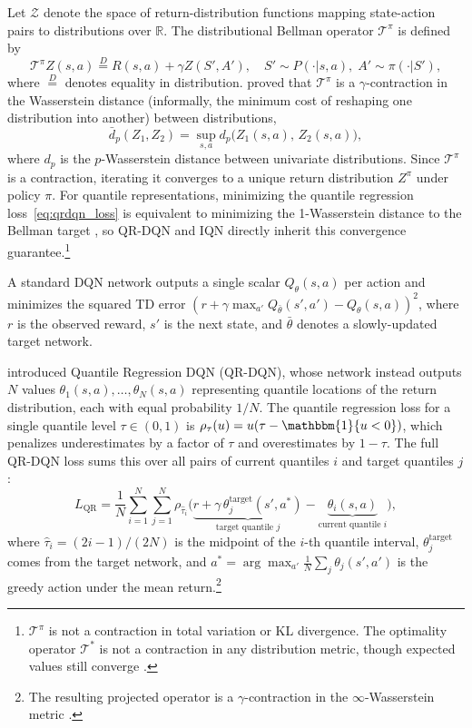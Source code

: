 Let $\mathcal{Z}$ denote the space of return-distribution functions mapping
state-action pairs to distributions over $\mathbb{R}$. The distributional
Bellman operator $\mathcal{T}^\pi$ is defined by
\begin{equation}
  \mathcal{T}^\pi Z(s,a) \stackrel{D}{=} R(s,a) + \gamma Z(S', A'),
  \quad S' \sim P(\cdot|s,a), \; A' \sim \pi(\cdot|S'),
  \label{eq:dist_bellman}
\end{equation}
where $\stackrel{D}{=}$ denotes equality in distribution.
\citet{Bellemare2017} proved that $\mathcal{T}^\pi$ is a $\gamma$-contraction
in the Wasserstein distance (informally, the minimum cost of reshaping one distribution into another) between distributions,
\begin{equation}
  \bar{d}_p(Z_1, Z_2) = \sup_{s,a} d_p\bigl(Z_1(s,a),\, Z_2(s,a)\bigr),
  \label{eq:wasserstein_metric}
\end{equation}
where $d_p$ is the $p$-Wasserstein distance between univariate
distributions. Since $\mathcal{T}^\pi$ is a contraction, iterating it
converges to a unique return distribution $Z^\pi$ under policy
$\pi$. For quantile representations, minimizing the quantile regression
loss~\eqref{eq:qrdqn_loss} is equivalent to minimizing the 1-Wasserstein
distance to the Bellman target \citep{Dabney2018a}, so QR-DQN and IQN
directly inherit this convergence guarantee.\footnote{$\mathcal{T}^\pi$
is not a contraction in total variation or KL divergence. The optimality operator $\mathcal{T}^*$ is not a contraction
in any distribution metric, though expected values still converge
\citep{Bellemare2017}.}

A standard DQN network outputs a single scalar $Q_\theta(s,a)$ per action
and minimizes the squared TD error
$(r + \gamma \max_{a'} Q_{\bar{\theta}}(s',a') - Q_\theta(s,a))^2$,
where $r$ is the observed reward, $s'$ is the next state, and
$\bar{\theta}$ denotes a slowly-updated target network.

\citet{Dabney2018a} introduced Quantile Regression DQN (QR-DQN), whose
network instead outputs $N$ values $\theta_1(s,a), \ldots, \theta_N(s,a)$
representing quantile locations of the return distribution, each with
equal probability $1/N$. The quantile regression loss for a single
quantile level $\tau \in (0,1)$ is
$\rho_\tau(u) = u(\tau - \mathbbm{1}\{u < 0\})$, which penalizes
underestimates by a factor of $\tau$ and overestimates by $1-\tau$.
The full QR-DQN loss sums this over all pairs of current quantiles $i$
and target quantiles $j$:
\begin{equation}
  L_{\text{QR}} = \frac{1}{N} \sum_{i=1}^{N} \sum_{j=1}^{N}
  \rho_{\hat{\tau}_i}\bigl(\underbrace{
    r + \gamma\, \theta_j^{\text{target}}(s', a^*)}_{\text{target quantile }j}
    - \underbrace{\theta_i(s,a)}_{\text{current quantile }i}
  \bigr),
  \label{eq:qrdqn_loss}
\end{equation}
where $\hat{\tau}_i = (2i-1)/(2N)$ is the midpoint of the $i$-th quantile
interval, $\theta_j^{\text{target}}$ comes from the target network, and
$a^* = \arg\max_{a'} \frac{1}{N}\sum_j \theta_j(s',a')$ is the greedy
action under the mean return.\footnote{The resulting projected operator is
a $\gamma$-contraction in the $\infty$-Wasserstein metric
\citep{Dabney2018a}.}

